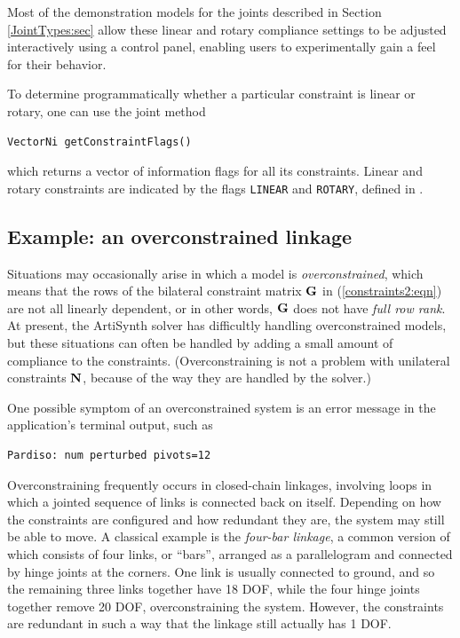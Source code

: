 Most of the demonstration models for the joints described in
Section \ref{JointTypes:sec} allow these linear and rotary compliance
settings to be adjusted interactively using a control panel, enabling
users to experimentally gain a feel for their behavior.

To determine programmatically whether a particular constraint is linear
or rotary, one can use the joint method
\begin{lstlisting}[]
  VectorNi getConstraintFlags()
\end{lstlisting}
%
which returns a vector of information flags for all its constraints.
Linear and rotary constraints are indicated by the flags {\tt LINEAR}
and {\tt ROTARY}, defined in 
.

\subsection{Example: an overconstrained linkage}
\label{FourBar:sec}

Situations may occasionally arise in which a model is {\it
overconstrained}, which means that the rows of the bilateral
constraint matrix ${\bf G}$ in (\ref{constraints2:eqn}) are not all
linearly dependent, or in other words, ${\bf G}$ does not have {\it full
row rank}. At present, the ArtiSynth solver has difficultly handling
overconstrained models, but these situations can often be handled by
adding a small amount of compliance to the
constraints. (Overconstraining is not a problem with unilateral
constraints ${\bf N}$, because of the way they are handled by the solver.)

One possible symptom of an overconstrained system is an error message
in the application's terminal output, such as
%
\begin{verbatim}
Pardiso: num perturbed pivots=12
\end{verbatim}

Overconstraining frequently occurs in closed-chain linkages, involving
loops in which a jointed sequence of links is connected back on
itself. Depending on how the constraints are configured and how
redundant they are, the system may still be able to move.  A classical
example is the {\it four-bar linkage}, a common version of which
consists of four links, or ``bars'', arranged as a parallelogram and
connected by hinge joints at the corners. One link is usually
connected to ground, and so the remaining three links together have 18
DOF, while the four hinge joints together remove 20 DOF,
overconstraining the system. However, the constraints are redundant in
such a way that the linkage still actually has 1 DOF.

